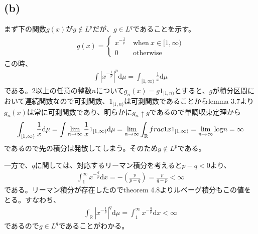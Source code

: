 \documentclass{article}
\begin{document}
\subsection{(b)}
まず下の関数$g(x)$が$g \notin L^p$だが、$g\in L^q$であることを示す。
\begin{align*}
	g(x) = \begin{cases}
	x^{-\frac{1}{p}}\ &\text{when}\ x \in [1, \infty)\\
	0\ &\text{otherwise}
	\end{cases}
\end{align*}
この時、
\begin{align*}
	\int |x^{-\frac{1}{p}}|^{p} \mathrm{d}\mu = \int_{[1,\infty)} \frac{1}{x} \mathrm{d}\mu
\end{align*}
である。2以上の任意の整数$n$について$g_n (x) = g1_{[1,n)}$とすると、$g$が積分区間において連続関数なので可測関数、$1_{[1,n)}$は可測関数であることからlemma 3.7より$g_n (x)$は常に可測関数であり、明らかに$g_n \uparrow g$であるので単調収束定理から
\begin{align*}
	\int_{[1,\infty)} \frac{1}{x} \mathrm{d}\mu = \int \lim_{n \to \infty} \frac{1}{x} 1_{[1, \infty)} \mathrm{d}\mu = \lim_{n \to \infty} \int_{\mathbb{R}} frac{1}{x} 1_{[1, \infty)} = \lim_{n \to \infty} {\rm log} n = \infty
\end{align*}
であるので先の積分は発散してしまう。そのため$g\notin L^p$である。

一方で、$q$に関しては、対応するリーマン積分を考えると$p-q < 0$より、
\begin{align*}
	\int_1^{\infty} x^{-\frac{q}{p}} \mathrm{d}x = -\left( \frac{p}{p-q} \right) = \frac{p}{q-p} < \infty
\end{align*}
である。リーマン積分が存在したのでtheorem 4.8よりルベーグ積分もこの値をとる。すなわち、
\begin{align*}
	\int_{\mathbb{R}} |x^{-\frac{1}{p}}|^q \mathrm{d}\mu = \int_1^{\infty} x^{-\frac{q}{p}} \mathrm{d}x < \infty
\end{align*}
であるので$g \in L^q$であることがわかる。
\end{document}
